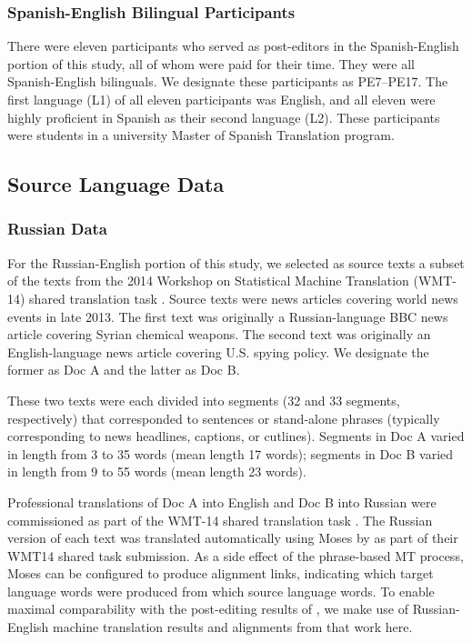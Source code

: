 \subsubsection{Spanish-English Bilingual Participants}

There were eleven participants who served as post-editors in the Spanish-English portion of this study, all of whom were paid for their time. 
%
They were all Spanish-English bilinguals.
%
We designate these participants as PE7--PE17. 
%
The first language (L1) of all eleven participants was English, and all eleven were highly proficient in Spanish as their second language (L2). 
%
These participants were students in a university Master of Spanish Translation program. 

\subsection{Source Language Data}

\subsubsection{Russian Data}

For the Russian-English portion of this study, we selected as source texts a subset of the texts from the 2014 Workshop on Statistical Machine Translation (WMT-14) shared translation task \citep{2014_WMT_Bojar_etal}.
%
Source texts were news articles covering world news events in late 2013.
%
The first text was originally a Russian-language BBC news article covering Syrian chemical weapons.
%
The second text was originally an English-language news article covering U.S. spying policy.
%
We designate the former as Doc A and the latter as Doc B.

These two texts were each divided into segments (32 and 33 segments, respectively) that corresponded to sentences or stand-alone phrases (typically corresponding to news headlines, captions, or cutlines).
%
Segments in Doc A varied in length from 3 to 35 words (mean length 17 words); 
%
segments in Doc B varied in length from 9 to 55 words (mean length 23 words).


Professional translations of Doc A into English and Doc B into Russian were commissioned as part of the WMT-14 shared translation task \citep{2014_WMT_Bojar_etal}.
%
%
The Russian version of each text was translated automatically using Moses \citep{2007_ACL_Koehn} by \citet{2014_WMT_Schwartz_etal} as part of their WMT14 shared task submission.
%
As a side effect of the phrase-based MT process, Moses can be configured to produce alignment links, indicating which target language words were produced from which source language words.
%
To enable maximal comparability with the post-editing results of \citet{2014_WMT_Schwartz_etal}, we make use of Russian-English machine translation results and alignments from that work here.




